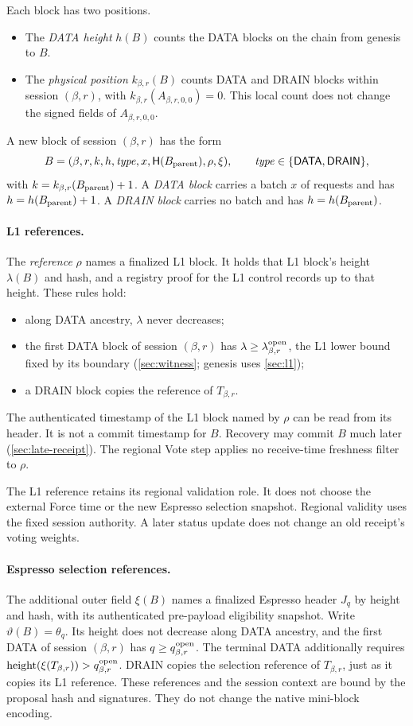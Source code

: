 \documentclass[11pt,a4paper]{article}
\newcommand{\Hash}{\mathsf H}
\newcommand{\tagg}[1]{\ensuremath{\mathsf{#1}}}
\newcommand{\defterm}[1]{\textcolor{rrBlue}{\textit{#1}}}
\begin{document}
Each block has two positions.
\begin{itemize}
\item The \defterm{DATA height} $h(B)$ counts the DATA blocks on the chain
from genesis to $B$.
\item The \defterm{physical position} $k_{\beta,r}(B)$ counts DATA and DRAIN blocks
within session $(\beta,r)$, with $k_{\beta,r}(A_{\beta,r,0,0})=0$. This local count does not change
the signed fields of $A_{\beta,r,0,0}$.
\end{itemize}
A new block of session $(\beta,r)$ has the form
\[
 B=(\beta,r,k,h,\mathit{type},x,\Hash(B_{\rm parent}),\rho,\xi),
 \qquad \mathit{type}\in\{\tagg{DATA},\tagg{DRAIN}\},
\]
with $k=k_{\beta,r}(B_{\rm parent})+1$. A \defterm{DATA block} carries a batch $x$ of
requests and has $h=h(B_{\rm parent})+1$. A \defterm{DRAIN block} carries no batch
and has $h=h(B_{\rm parent})$.

\paragraph{L1 references.}
The \defterm{reference} $\rho$ names a finalized L1 block. It holds that L1
block's height $\lambda(B)$ and hash, and a registry proof for the L1
control records up to that height. These rules hold:
\begin{itemize}
\item along DATA ancestry, $\lambda$ never decreases;
\item the first DATA block of session $(\beta,r)$ has $\lambda\ge
\lambda^{\rm open}_{\beta,r}$, the L1 lower bound fixed by its boundary
(\cref{sec:witness}; genesis uses \cref{sec:l1});
\item a DRAIN block copies the reference of $T_{\beta,r}$.
\end{itemize}
The authenticated timestamp of the L1 block named by $\rho$ can be
read from its header. It is not a commit timestamp for $B$. Recovery
may commit $B$ much later (\cref{sec:late-receipt}). The
regional Vote step applies no receive-time freshness filter to $\rho$.

The L1 reference retains its regional validation role. It does not
choose the external Force time or the new Espresso selection snapshot.
Regional validity uses the fixed session authority. A later status update
does not change an old receipt's voting weights.

\paragraph{Espresso selection references.}
The additional outer field $\xi(B)$ names a finalized Espresso header
$J_q$ by height and hash, with its authenticated pre-payload eligibility
snapshot. Write $\vartheta(B)=\theta_q$. Its height does not decrease
along DATA ancestry, and the first DATA of session $(\beta,r)$ has
$q\ge q_{\beta,r}^{\rm open}$. The terminal DATA additionally requires
$\operatorname{height}(\xi(T_{\beta,r}))>q_{\beta,r}^{\rm open}$.
DRAIN copies the selection reference of $T_{\beta,r}$,
just as it copies its L1 reference. These references and the session
context are bound by the proposal hash and signatures. They do not
change the native mini-block encoding.
\end{document}
